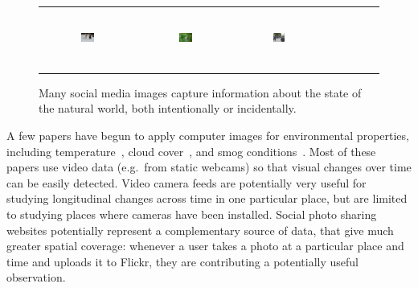\begin{figure}[t]
{\tiny{
\begin{center}
\begin{tabular}{@{}c@{\,\,\,}c@{\,\,\,}c@{\,\,\,}c@{\,\,\,}c@{\,\,\,}c@{\,\,\,}c@{\,\,\,}c@{\,\,\,}}
\includegraphics[width=0.15\textwidth,height=0.75in]{image/dogsnow.jpg} &
\includegraphics[width=0.15\textwidth,height=0.75in]{image/intentiongreen.jpg} &
\includegraphics[width=0.15\textwidth,height=0.75in]{image/humantree.jpg} \\
\end{tabular}
\end{center}
}}
\vspace{-12pt}
\caption{Many social media images capture information about the state of the natural world, both intentionally or incidentally.}
\label{fig:flickrexp}
\vspace{-12pt}
\end{figure}


A few papers have begun to apply computer images for environmental
properties, including temperature~\cite{glasner2015hot}, cloud
cover~\cite{murdock2013webcam2satellite}, and smog conditions~\cite{li2015smog}. Most of
these papers use video data (e.g.\ from static webcams) so that visual
changes over time can be easily detected. Video camera feeds are
potentially very useful for studying longitudinal changes across time
in one particular place, but are limited to studying places where
cameras have been installed. Social photo sharing websites potentially
represent a complementary source of data, that give much greater
spatial coverage: whenever a user takes a photo at a particular place
and time and uploads it to Flickr, they are contributing a potentially
useful observation.

